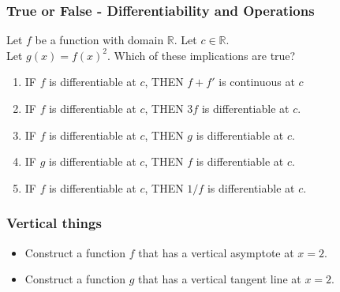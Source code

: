 \documentclass[14pt]{beamer}
\begin{document}
	\begin{frame}[t]
		\fontsize{13}{13}\selectfont
		\frametitle{True or False - Differentiability and Operations}

		Let $f$ be a function with domain $\mathbb{R}$. Let $c \in \mathbb{R}$. \\ Let
		$\displaystyle g(x) = f(x)^{2}$. Which of these implications are true?

		\vfill

		\begin{enumerate}
			\item IF $f$ is {\color{blue} differentiable} at $c$, THEN $f+f'$ is
				{\color{red} continuous} at $c$
				\vfill

			\item IF $f$ is {\color{blue} differentiable} at $c$, THEN $3f$ is
				{\color{blue} differentiable} at $c$.
				\vfill

			\item IF $f$ is {\color{blue} differentiable} at $c$, THEN $g$ is
				{\color{blue} differentiable} at $c$.
				\vfill

			\item IF $g$ is {\color{blue} differentiable} at $c$, THEN $f$ is
				{\color{blue} differentiable} at $c$.
				\vfill

			\item IF $f$ is {\color{blue} differentiable} at $c$, THEN $1/f$ is
				{\color{blue} differentiable} at $c$.
				\vfill
		\end{enumerate}
	\end{frame}


	\begin{frame}[t]
		\frametitle{Vertical things}

		\begin{itemize}
			\item Construct a function $f$ that has a {\color{red} vertical asymptote}
				at $x=2$.

			\item Construct a function $g$ that has a {\color{blue} vertical tangent line}
				at $x=2$.
		\end{itemize}
	\end{frame}

\end{document}
